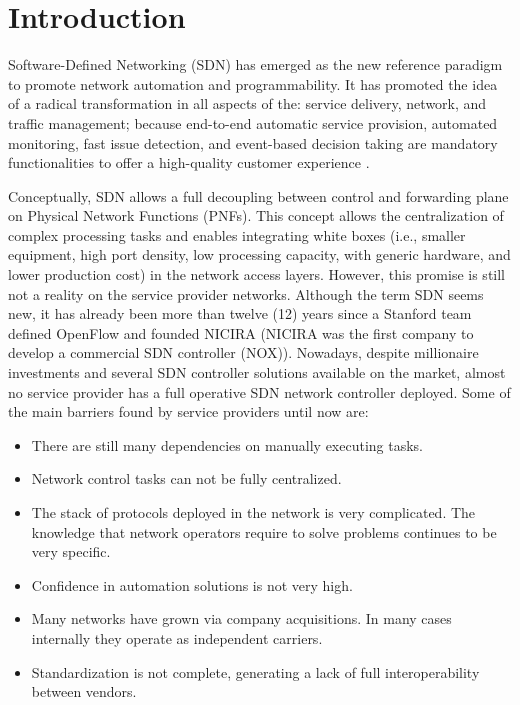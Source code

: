 \documentclass[10pt, conference]{IEEEtran}
\begin{document}
\section{Introduction}
Software-Defined Networking (SDN) has emerged as the new reference paradigm to promote network automation and programmability. It has promoted the idea of a radical transformation in all aspects of the: service delivery, network, and traffic management; because end-to-end automatic service provision, automated monitoring, fast issue detection, and event-based decision taking are mandatory functionalities to offer a high-quality customer experience \cite{ordonez2017network}.

Conceptually, SDN allows a full decoupling between control and forwarding plane on Physical Network Functions (PNFs). 
This concept allows the centralization of complex processing tasks and enables integrating white boxes (i.e., smaller equipment, high port density, low processing capacity,  with generic hardware, and lower production cost) in the network access layers. However, this promise is still not a reality on the service provider networks. Although the term SDN seems new, it has already been more than twelve (12) years since a Stanford team defined OpenFlow and founded NICIRA (NICIRA was the first company to develop a commercial SDN controller (NOX)). Nowadays, despite millionaire investments and several SDN controller solutions available \cite{medved2014opendaylight,berde2014onos} on the market, almost no service provider has a full operative SDN network controller deployed. Some of the main barriers found by service providers until now are:

\begin{itemize}
    \item There are still many dependencies on manually executing tasks.
    \item Network control tasks can not be fully centralized.
    \item The stack of protocols deployed in the network is very complicated.  The knowledge that network operators require to solve problems continues to be very specific.
    \item Confidence in automation solutions is not very high.
    \item Many networks have grown via company acquisitions. In many cases internally they operate as independent carriers. 
    \item Standardization is not complete, generating a lack of full interoperability between vendors.
\end{itemize}
\end{document}
